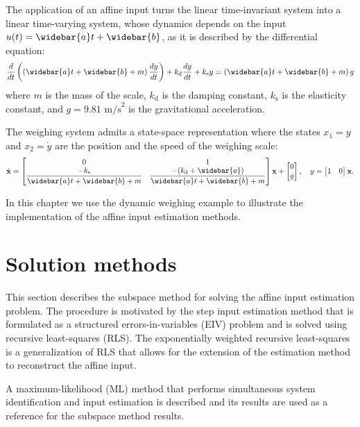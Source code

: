 The application of an affine input turns the linear time-invariant system into a linear time-varying system, whose
dynamics depends on the input $u(t) = \widebar{a} t + \widebar{b}$, as it is described by the differential equation:
\begin{equation} \dfrac{d}{dt} \left( \left( \widebar{a} t + \widebar{b} + m \right) \dfrac{dy}{dt} \right) + k_{\mathrm{d}} \dfrac{dy}{dt} + k_{\mathrm{s}} y = \left( \widebar{a} t + \widebar{b} + m \right) g \end{equation}
where $m$ is the mass of the scale, $k_{\mathrm{d}}$ is the damping constant, $k_{\mathrm{s}}$ is the elasticity constant, and $g = 9.81$ $\mathrm{m/s}^2$ is the gravitational acceleration. 

The weighing system admits a state-space representation where the states $x_1=y$ and $x_2=\dot{y}$ are the position and the speed of the weighing scale: 
\begin{equation} \dot{\mathbf{x}} = \begin{bmatrix} 0 & 1 \\ \dfrac{-k_{\mathrm{s}}}{\widebar{a} t + \widebar{b} + m} & \dfrac{-(k_{\mathrm{d}} + \widebar{a})}{\widebar{a} t + \widebar{b} + m} \end{bmatrix} \mathbf{x} + \begin{bmatrix} 0 \\ g \end{bmatrix}, \quad y = \begin{bmatrix} 1 & 0  \end{bmatrix} \mathbf{x} . \label{eqn:ltvsystem} \end{equation}

In this chapter we use the dynamic weighing example to illustrate the implementation of the affine input estimation methods.


\section{Solution methods}

This section describes the subspace method for solving the affine input estimation problem.
The procedure is motivated by the step input estimation method that is formulated as a structured errors-in-variables (EIV) problem and is solved using recursive least-squares (RLS).
The exponentially weighted recursive least-squares is a generalization of RLS that allows for the extension of the estimation method to reconstruct the affine input.

A maximum-likelihood (ML) method that performs simultaneous system identification and input estimation is described and its results are used as a reference for the subspace method results.


